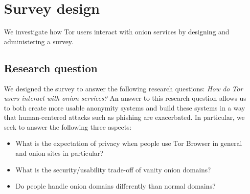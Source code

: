 \section{Survey design}
\label{sec:survey-design}

We investigate how Tor users interact with onion services by designing and
administering a survey.

\subsection{Research question}
We designed the survey to answer the following research questions: \emph{How do
Tor users interact with onion services?}  An answer to this research question
allows us to both create more usable anonymity systems and build these systems
in a way that human-centered attacks such as phishing are exacerbated.  In
particular, we seek to answer the following three aspects:

\begin{itemize}
    \item What is the expectation of privacy when people use Tor Browser in
        general and onion sites in particular?
    \item What is the security/usability trade-off of vanity onion domains?
    \item Do people handle onion domains differently than normal domains?
\end{itemize}

